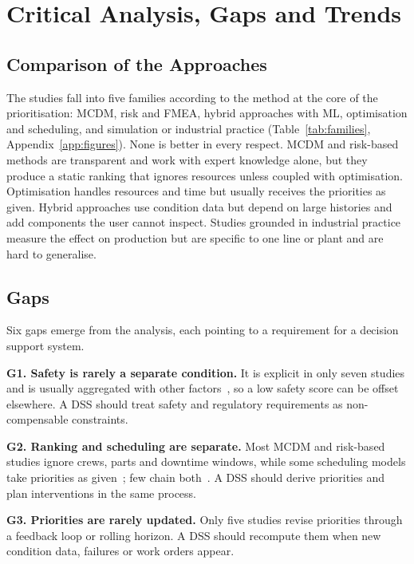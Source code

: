 \section{Critical Analysis, Gaps and Trends}
\label{sec:analysis}

\subsection{Comparison of the Approaches}
\label{sec:comparison}

The studies fall into five families according to the method at the core of the prioritisation: MCDM, risk and FMEA, hybrid approaches with ML, optimisation and scheduling, and simulation or industrial practice (Table~\ref{tab:families}, Appendix~\ref{app:figures}). None is better in every respect. MCDM and risk-based methods are transparent and work with expert knowledge alone, but they produce a static ranking that ignores resources unless coupled with optimisation. Optimisation handles resources and time but usually receives the priorities as given. Hybrid approaches use condition data but depend on large histories and add components the user cannot inspect. Studies grounded in industrial practice measure the effect on production but are specific to one line or plant and are hard to generalise.

\subsection{Gaps}
\label{sec:gaps}

Six gaps emerge from the analysis, each pointing to a requirement for a decision support system.

\textbf{G1. Safety is rarely a separate condition.} It is explicit in only seven studies and is usually aggregated with other factors~\cite{panwar2021,delgado2026}, so a low safety score can be offset elsewhere. A DSS should treat safety and regulatory requirements as non-compensable constraints.

\textbf{G2. Ranking and scheduling are separate.} Most MCDM and risk-based studies ignore crews, parts and downtime windows, while some scheduling models take priorities as given~\cite{gao2024}; few chain both~\cite{rios2025,danach2026,darko2026,moradi2024}. A DSS should derive priorities and plan interventions in the same process.

\textbf{G3. Priorities are rarely updated.} Only five studies revise priorities through a feedback loop or rolling horizon. A DSS should recompute them when new condition data, failures or work orders appear.

